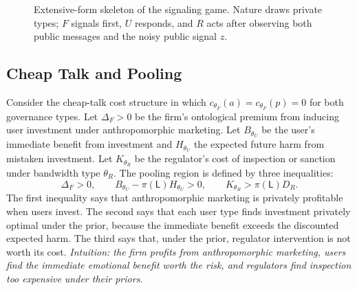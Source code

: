 \begin{figure}[t]
\centering
{}
\caption{Extensive-form skeleton of the signaling game. Nature draws private
types; $F$ signals first, $U$ responds, and $R$ acts after observing both public
messages and the noisy public signal $z$.}
\label{fig:signaling-tree}
\end{figure}

\subsection{Cheap Talk and Pooling}
\label{subsec:cheap-talk-pooling}

Consider the cheap-talk cost structure in which $c_{\theta_F}(a)=c_{\theta_F}(p)=0$
for both governance types. Let $\Delta_F>0$ be the firm's ontological premium
from inducing user investment under anthropomorphic marketing. Let $B_{\theta_U}$
be the user's immediate benefit from investment and $H_{\theta_U}$ the expected
future harm from mistaken investment. Let $K_{\theta_R}$ be the regulator's cost
of inspection or sanction under bandwidth type $\theta_R$. The pooling region is
defined by three inequalities:
\[
\Delta_F>0,\qquad
B_{\theta_U}-\pi(\mathsf{L})H_{\theta_U}>0,\qquad
K_{\theta_R}>\pi(\mathsf{L})D_R .
\]
The first inequality says that anthropomorphic marketing is privately profitable
when users invest. The second says that each user type finds investment
privately optimal under the prior, because the immediate benefit exceeds the
discounted expected harm. The third says that, under the prior, regulator
intervention is not worth its cost.
\emph{Intuition: the firm profits from anthropomorphic marketing, users find the immediate emotional benefit worth the risk, and regulators find inspection too expensive under their priors.}

